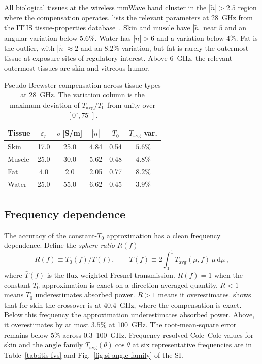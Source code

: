 \documentclass[journal,twocolumn,10pt]{IEEEtran}
\newcommand{\Tavg}{T_{\mathrm{avg}}}
\newcommand{\Tbar}{\bar{T}}
\newcommand{\ntilde}{\tilde{n}}
\newcommand{\diff}{\mathrm{d}}
\begin{document}
All biological tissues at the wireless mmWave band cluster in the
$|\ntilde| > 2.5$ region where the compensation operates.
 lists the relevant parameters at 28~GHz from
the IT'IS tissue-properties database~\cite{ITISv5,Gabriel1996}. Skin and
muscle have $|\ntilde|$ near $5$ and an angular variation below
$5.6\%$. Water has $|\ntilde| > 6$ and a variation below $4\%$.
Fat is the outlier, with $|\ntilde| \approx 2$ and an $8.2\%$
variation, but fat is rarely the outermost tissue at exposure sites
of regulatory interest. Above $6$~GHz, the relevant outermost
tissues are skin and vitreous humor.

\begin{table}[!t]
\centering
\caption{Pseudo-Brewster compensation across tissue types at
28~GHz. The variation column is the maximum deviation of
$\Tavg/T_0$ from unity over $[0^\circ, 75^\circ]$.}
\label{tab:materials}
\begin{tabular}{lccccc}
\toprule
Tissue & $\varepsilon_r$ & $\sigma$\,[S/m] & $|\ntilde|$ & $T_0$
  & $\Tavg$ var. \\
\midrule
Skin   & 17.0 & 25.0 & 4.84 & 0.54 & $5.6\%$ \\
Muscle & 25.0 & 30.0 & 5.62 & 0.48 & $4.8\%$ \\
Fat    &  4.0 &  2.0 & 2.05 & 0.77 & $8.2\%$ \\
Water  & 25.0 & 55.0 & 6.62 & 0.45 & $3.9\%$ \\
\bottomrule
\end{tabular}
\end{table}

\subsection{Frequency dependence}\label{subsec:pB-freq}

The accuracy of the constant-$T_0$ approximation has a clean
frequency dependence. Define the \emph{sphere ratio} $R(f)$
\begin{equation}\label{eq:R-of-f}
  R(f) \equiv T_0(f) / \Tbar(f),
  \qquad
  \Tbar(f) \equiv 2\int_0^1 \Tavg(\mu, f)\,\mu\,\diff\mu\,,
\end{equation}
where $\Tbar(f)$ is the flux-weighted Fresnel transmission. $R(f) =
1$ when the constant-$T_0$ approximation is exact on a
direction-averaged quantity. $R < 1$ means $T_0$ underestimates
absorbed power. $R > 1$ means it overestimates. 
shows that for skin the crossover is at 40.4~GHz, where the
compensation is exact. Below this
frequency the approximation underestimates absorbed power. Above, it
overestimates by at most $3.5\%$ at 100~GHz. The root-mean-square error
remains below $5\%$ across $0.3$--100~GHz. Frequency-resolved
Cole--Cole values for skin and the angle family
$\Tavg(\theta)\cos\theta$ at six representative frequencies are in
Table~\ref{tab:itis-fvs} and Fig.~\ref{fig:si-angle-family} of the SI.
\end{document}
